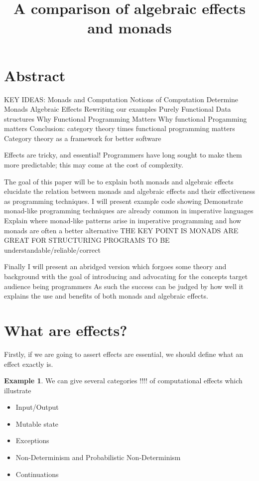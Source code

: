 \documentclass[a4paper,10pt]{article}
\title{A comparison of algebraic effects and monads}
\theoremstyle{definition}
\newtheorem{example}{Example}[section]
\begin{document}
\section{Abstract}

KEY IDEAS:
Monads and Computation
Notions of Computation Determine Monads
Algebraic Effects
Rewriting our examples
Purely Functional Data structures
Why Functional Programming Matters
Why functional Progamming matters
Conclusion: category theory times functional programming matters
Category theory as a framework for better software


Effects are tricky, and essential!
Programmers have long sought to make them more predictable;
this may come at the cost of complexity.

The goal of this paper will be to explain both monads and algebraic effects
elucidate the relation between monads and algebraic effects
and their effectiveness as programming techniques.
I will present example code showing
Demonstrate monad-like programming techniques are already common in imperative languages
Explain where monad-like patterns arise in imperative programming and how monads are often a better alternative
THE KEY POINT IS MONADS ARE GREAT FOR STRUCTURING PROGRAMS TO BE understandable/reliable/correct

Finally I will present an abridged version which forgoes some theory and background
with the goal of introducing and advocating for the concepts
target audience being programmers
As such the success can be judged by how well it explains the use and benefits of both monads and algebraic effects.

\pagebreak
\tableofcontents
\pagebreak

\section{What are effects?}
Firstly, if we are going to assert effects are essential,
we should define what an effect exactly is.

\begin{example}
    We can give several categories !!!! of computational effects
    which illustrate
    \begin{itemize}
        \item Input/Output
        \item Mutable state
        \item Exceptions
        \item Non-Determinism and Probabilistic Non-Determinism
        \item Continuations
    \end{itemize}
\end{example}
\end{document}
